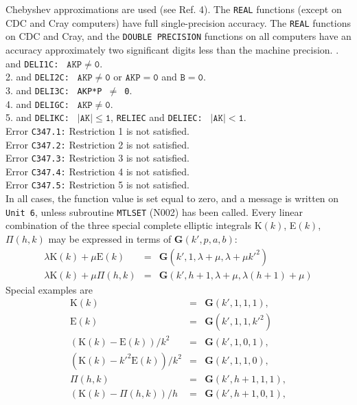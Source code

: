 Chebyshev approximations are used (see Ref. 4).
\Accuracy
The {\tt REAL} functions (except on CDC and Cray computers) have full
single-precision accuracy. The {\tt REAL} functions on CDC and Cray, and
the {\tt DOUBLE PRECISION} functions on all computers have an accuracy
approximately two significant digits less than the machine precision.
.  and {\tt DELI1C:} \ $\mathtt{AKP \ne 0}$. \\
2.  and {\tt DELI2C:} \ $\mathtt{AKP \ne 0}$
or $\mathtt{AKP = 0}$ and $\mathtt{B = 0}$. \\
3.  and {\tt DELI3C:} \ {\tt AKP*P $\ne$ 0}. \\
4.  and {\tt DELIGC:} \ $\mathtt{AKP \ne 0}$. \\
5.  and {\tt DELIKC:} \ $\mathtt{|AK| \le 1}$, \qquad
{\tt RELIEC} and {\tt DELIEC:} \ $\mathtt{|AK| < 1}$. \\
\Errorh
Error {\tt C347.1:} Restriction 1 is not satisfied. \\
Error {\tt C347.2:} Restriction 2 is not satisfied. \\
Error {\tt C347.3:} Restriction 3 is not satisfied. \\
Error {\tt C347.4:} Restriction 4 is not satisfied. \\
Error {\tt C347.5:} Restriction 5 is not satisfied. \\
In all cases, the function value
is set equal to zero, and a message is written on {\tt Unit 6},
unless subroutine {\tt MTLSET} (N002) has been called.
\Notes
Every linear combination of the three special complete elliptic
integrals K$(k)$, E$(k)$, $\Pi(h,k)$ may be expressed in terms of
$\mathbf{G}(k',p,a,b)$:
$$\begin{array}{rcl}
\lambda \mathrm{K}(k) + \mu \mathrm{E}(k) & = &
\mathbf{G}(k',1,\lambda+\mu,\lambda+\mu {k'}^2) \\
\lambda \mathrm{K}(k) + \mu \Pi(h,k) & = &
\mathbf{G}(k',h+1,\lambda+\mu,\lambda (h+1)+\mu)
\end{array} $$
Special examples are
$$\begin{array}{rcl}
\mathrm{K}(k)                           & = & \mathbf{G}(k',1,1,1), \\
\mathrm{E}(k)                           & = & \mathbf{G}(k',1,1,{k'}^2)\\
(\mathrm{K}(k)-\mathrm{E}(k))/k^2       & = & \mathbf{G}(k',1,0,1), \\
(\mathrm{K}(k)-{k'}^2\mathrm{E}(k))/k^2 & = & \mathbf{G}(k',1,1,0), \\
\Pi(h,k)                                & = & \mathbf{G}(k',h+1,1,1),\\
(\mathrm{K}(k)-\Pi(h,k))/h              & = & \mathbf{G}(k',h+1,0,1),\\
\end{array} $$
